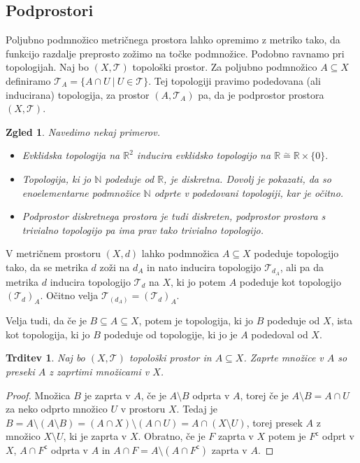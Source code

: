 \documentclass[10pt, a4paper]{article}
\newtheorem{trditev}[izr]{Trditev}
\newtheorem{zgled}{Zgled}[section]
\newenvironment{noticeC}{%
  \tcolorbox[%
  notitle,
  empty,
  enhanced,  %
  breakable,
  coltext=black, 
  fontupper=\rmfamily,
  parbox=false,
  noparskip,
  sharp corners,
  boxrule=-1pt,  %
  frame hidden,
  left=7pt,  %
  right=7pt,
  top=5pt,
  bottom=5pt,
  before skip=2.5ex plus 2pt,
  after skip=2.5ex plus 2pt,
  overlay unbroken and last={%
  },
  ]}
{\endtcolorbox}
\newenvironment{dokaz}%
  {\begin{noticeC}\begin{proof}}%
  {\end{proof}\end{noticeC}}
\newcommand{\stcomp}[1]{{#1}^{\mathsf{c}}}
\newcommand{\N}{\mathbb {N}}
\newcommand{\R}{\mathbb {R}}
\newcommand{\topo}[1]{\mathcal{#1}}
\begin{document}
\subsection{Podprostori}

Poljubno podmnožico metričnega prostora lahko opremimo z metriko tako, da funkcijo razdalje preprosto zožimo na točke podmnožice.
Podobno ravnamo pri topologijah. Naj bo $(X, \topo{T})$ topološki prostor.
Za poljubno podmnožico $A\subseteq X$ definiramo $\topo{T}_A = \{A \cap U\ |\ U \in \topo{T}\}$.
Tej topologiji pravimo podedovana (ali inducirana) topologija, za prostor $(A, \topo{T}_A)$ pa,
da je podprostor prostora $(X, \topo{T})$.

\begin{zgled}
  Navedimo nekaj primerov.
  \begin{itemize}
    \item Evklidska topologija na $\R^2$ inducira evklidsko topologijo na $\R \stackrel{\sim}{=} \R \times \{0\}.$
    \item Topologija, ki jo $\N$ podeduje od $\R$, je diskretna. Dovolj je pokazati, da so enoelementarne podmnožice
    $\N$ odprte v podedovani topologiji, kar je očitno.
    \item Podprostor diskretnega prostora je tudi diskreten, podprostor prostora s trivialno topologijo pa ima 
    prav tako trivialno topologijo.
  \end{itemize}
\end{zgled}

V metričnem prostoru $(X, d)$ lahko podmnožica $A \subseteq X$ podeduje topologijo tako, da se metrika $d$ zoži na $d_A$ in 
nato inducira topologijo $\topo{T}_{d_A}$, ali pa da metrika $d$ inducira topologijo $\topo{T}_d$ na $X$, ki jo potem $A$ podeduje kot topologijo $(\topo{T}_d)_A$.
Očitno velja $\topo{T}_{(d_A)} = (\topo{T}_d)_A$.

Velja tudi, da če je $B \subseteq A \subseteq X$, potem je topologija, ki jo $B$ podeduje od $X$, ista kot topologija,
ki jo $B$ podeduje od topologije, ki jo je $A$ podedoval od $X$.

\begin{trditev}
  Naj bo $(X, \topo{T})$ topološki prostor in $A \subseteq X$.
  Zaprte množice v $A$ so preseki $A$ z zaprtimi množicami v $X$.
\end{trditev}

\begin{dokaz}
  Množica $B$ je zaprta v $A$, če je $A \setminus B$ odprta v $A$, torej če je $A \setminus B = A \cap U$
  za neko odprto množico $U$ v prostoru $X$.
  Tedaj je $B = A \setminus (A \setminus B) = (A \cap X) \setminus (A \cap U) = A \cap (X \setminus U)$, torej presek $A$ z množico $X \setminus U$,
  ki je zaprta v $X$. Obratno, če je $F$ zaprta v $X$ potem je $\stcomp{F}$ odprt v $X$,
  $A \cap \stcomp{F}$ odprta v $A$ in $A \cap F = A \setminus (A \cap \stcomp{F})$ zaprta v $A$.
\end{dokaz}
\end{document}
